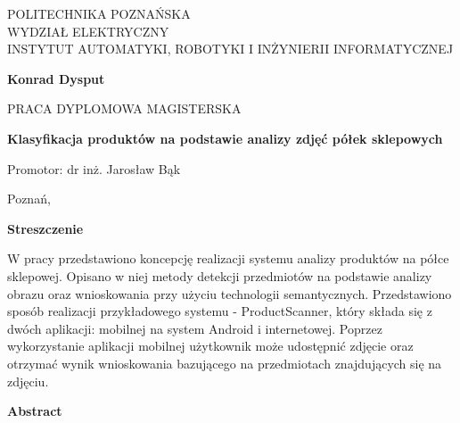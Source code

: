 \documentclass[12pt,a4paper,leqno,oneside,titlepage]{mwrep}
\begin{document}
\begin{titlepage}
\begin{center}
{\large POLITECHNIKA POZNAŃSKA\\ WYDZIAŁ ELEKTRYCZNY\\ INSTYTUT AUTOMATYKI, ROBOTYKI I INŻYNIERII INFORMATYCZNEJ\par}
\end{center}
\vspace{1.5cm plus 1fill}
\begin{center}
{\bf \Large Konrad Dysput\par}
\end{center}
\vspace{1.5cm plus 1mm minus 2mm}
\begin{center}
{\large PRACA DYPLOMOWA MAGISTERSKA\par}
\end{center}
\vspace{1.5cm plus 1mm minus 2mm}
\begin{center}
{\huge\textbf{Klasyfikacja produktów na podstawie analizy zdjęć półek sklepowych }\par}
\vspace{1.5cm plus 1.5fill}
\begin{flushright}
{\large Promotor: dr inż. Jarosław Bąk}
\end{flushright}
\vspace{4cm plus .1fill}
{\large Poznań,\par}
\end{center}
\end{titlepage}
\newpage
\begin{center}
	
{\large\textbf{Streszczenie}}
\end{center}
	W pracy przedstawiono koncepcję realizacji systemu analizy produktów na półce sklepowej. Opisano w niej metody detekcji przedmiotów na podstawie analizy obrazu oraz wnioskowania przy użyciu technologii semantycznych. Przedstawiono sposób realizacji przykładowego systemu - ProductScanner, który składa się z dwóch aplikacji: mobilnej na system Android i internetowej. Poprzez wykorzystanie aplikacji mobilnej użytkownik może udostępnić zdjęcie oraz otrzymać wynik wnioskowania bazującego na przedmiotach znajdujących się na zdjęciu.
	\newline
	
\begin{center}
	{\large\textbf{Abstract}}
\end{center}
\end{document}
